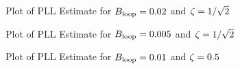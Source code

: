 \documentclass{article}
\begin{document}
\begin{figure}[H]
	\centerline{}
	\caption{Plot of PLL Estimate for $\protect{B_\text{loop}} = 0.02$ and $\protect{\zeta = 1/\sqrt{2}}$}
	\label{fig::convergence_Bloop_0p02_damp_sqrt_2}
\end{figure}

\begin{figure}[H]
	\centerline{}
	\caption{Plot of PLL Estimate for $\protect{B_\text{loop}} = 0.005$ and $\protect{\zeta = 1/\sqrt{2}}$}
	\label{fig::convergence_Bloop_0p005_damp_sqrt_2}
\end{figure}

\begin{figure}[H]
	\centerline{}
	\caption{Plot of PLL Estimate for $\protect{B_\text{loop}} = 0.01$ and $\protect{\zeta = 0.5}$}
	\label{fig::convergence_Bloop_0p01_damp_0p5}
\end{figure}
\end{document}
